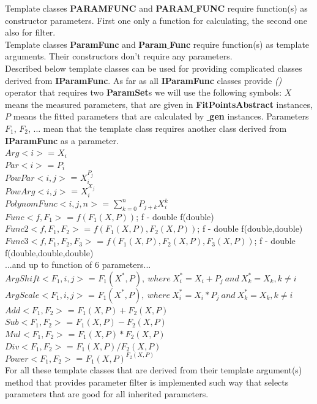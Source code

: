 \documentclass[a4paper]{article}
\begin{document}
Template classes \textbf{PARAMFUNC} and \textbf{PARAM$\_$FUNC} 
require function(s) as constructor parameters.
First one only a function for calculating, the second one also for filter.
\\
Template classes \textbf{ParamFunc} and \textbf{Param$\_$Func} 
require function(s) as template arguments.
Their constructors don't require any parameters.
\\
Described below template classes can be used for providing complicated classes derived from \textbf{IParamFunc}.
As far as all \textbf{IParamFunc} classes provide \textit{()} operator that requires two \textbf{ParamSet}s we will use the following symbols: $X$ means the measured parameters, that are given in \textbf{FitPointsAbstract} instances, $P$ means the fitted parameters that are calculated by \textbf{$\_$gen} instances.
Parameters $F_1$, $F_2$, ... mean that the template class requires another class derived from \textbf{IParamFunc} as a parameter.
\\
\textbf{$Arg<i>$} = $X_i$\\
\textbf{$Par<i>$} = $P_i$\\
\textbf{$PowPar<i,j>$} = $X_i^{P_j}$\\
\textbf{$PowArg<i,j>$} = $X_i^{X_j}$\\
\textbf{$PolynomFunc<i,j,n>$} = $\sum_{k=0}^{n}P_{j+k}X_i^k$\\
\textbf{$Func<f,F_1>$} = $f(F_1(X,P))$; f - double f(double)\\
\textbf{$Func2<f,F_1,F_2>$} = $f(F_1(X,P),F_2(X,P))$; f - double f(double,double)\\
\textbf{$Func3<f,F_1,F_2,F_3>$} = $f(F_1(X,P),F_2(X,P),F_3(X,P))$; f - double f(double,double,double)\\
...and up to function of 6 parameters...\\
\textbf{$ArgShift<F_1,i,j>$} = $F_1(X^*,P),~where~X^*_i=X_i+P_j~and~X^*_k=X_k, k \neq i$\\
\textbf{$ArgScale<F_1,i,j>$} = $F_1(X^*,P),~where~X^*_i=X_i*P_j~and~X^*_k=X_k, k \neq i$\\
\textbf{$Add<F_1,F_2>$} = $F_1(X,P)+F_2(X,P)$\\
\textbf{$Sub<F_1,F_2>$} = $F_1(X,P)-F_2(X,P)$\\
\textbf{$Mul<F_1,F_2>$} = $F_1(X,P)*F_2(X,P)$\\
\textbf{$Div<F_1,F_2>$} = $F_1(X,P)/F_2(X,P)$\\
\textbf{$Power<F_1,F_2>$} = $F_1(X,P)^{F_2(X,P)}$\\
For all these template classes that are derived from their template argument(s) method that provides parameter filter is implemented such way that selects parameters that are good for all inherited parameters.
\end{document}
